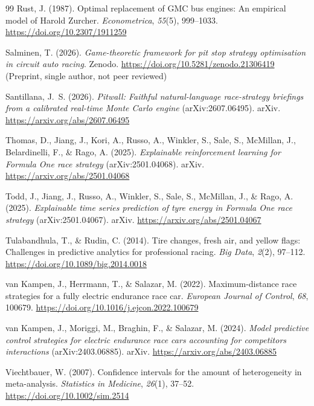 \documentclass[11pt,a4paper]{article}
\begin{document}
\begin{thebibliography}{99}
Rust, J. (1987). Optimal replacement of GMC bus engines: An empirical model of
Harold Zurcher. \emph{Econometrica}, \emph{55}(5), 999--1033.
\url{https://doi.org/10.2307/1911259}

Salminen, T. (2026). \emph{Game-theoretic framework for pit stop strategy
optimisation in circuit auto racing}. Zenodo.
\url{https://doi.org/10.5281/zenodo.21306419} (Preprint, single author, not
peer reviewed)

Santillana, J.~S. (2026). \emph{Pitwall: Faithful natural-language
race-strategy briefings from a calibrated real-time Monte Carlo engine}
(arXiv:2607.06495). arXiv. \url{https://arxiv.org/abs/2607.06495}

Thomas, D., Jiang, J., Kori, A., Russo, A., Winkler, S., Sale, S., McMillan,
J., Belardinelli, F., \& Rago, A. (2025). \emph{Explainable reinforcement
learning for Formula One race strategy} (arXiv:2501.04068). arXiv.
\url{https://arxiv.org/abs/2501.04068}

Todd, J., Jiang, J., Russo, A., Winkler, S., Sale, S., McMillan, J., \& Rago,
A. (2025). \emph{Explainable time series prediction of tyre energy in Formula
One race strategy} (arXiv:2501.04067). arXiv.
\url{https://arxiv.org/abs/2501.04067}

Tulabandhula, T., \& Rudin, C. (2014). Tire changes, fresh air, and yellow
flags: Challenges in predictive analytics for professional racing. \emph{Big
Data}, \emph{2}(2), 97--112. \url{https://doi.org/10.1089/big.2014.0018}

van Kampen, J., Herrmann, T., \& Salazar, M. (2022). Maximum-distance race
strategies for a fully electric endurance race car. \emph{European Journal of
Control}, \emph{68}, 100679.
\url{https://doi.org/10.1016/j.ejcon.2022.100679}

van Kampen, J., Moriggi, M., Braghin, F., \& Salazar, M. (2024). \emph{Model
predictive control strategies for electric endurance race cars accounting for
competitors interactions} (arXiv:2403.06885). arXiv.
\url{https://arxiv.org/abs/2403.06885}

Viechtbauer, W. (2007). Confidence intervals for the amount of heterogeneity in
meta-analysis. \emph{Statistics in Medicine}, \emph{26}(1), 37--52.
\url{https://doi.org/10.1002/sim.2514}

\end{thebibliography}
\end{document}
